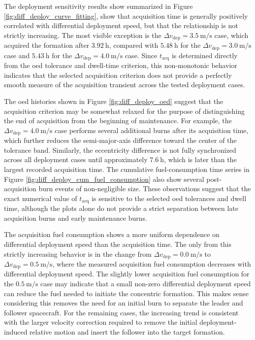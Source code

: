 The deployment sensitivity results show summarized in Figure \ref{fig:diff_deploy_curve_fitting}, show that acquisition time is generally positively correlated with differential deployment speed, but that the relationship is not strictly increasing. The most visible exception is the $\Delta v_{\mathrm{dep}}=3.5~\mathrm{m/s}$ case, which acquired the formation after $3.92~\mathrm{h}$, compared with $5.48~\mathrm{h}$ for the $\Delta v_{\mathrm{dep}}=3.0~\mathrm{m/s}$ case and $5.43~\mathrm{h}$ for the $\Delta v_{\mathrm{dep}}=4.0~\mathrm{m/s}$ case. Since $t_{\mathrm{acq}}$ is determined directly from the \gls{oed} tolerance and dwell-time criterion, this non-monotonic behavior indicates that the selected acquisition criterion does not provide a perfectly smooth measure of the acquisition transient across the tested deployment cases.

The \gls{oed} histories shown in Figure \ref{fig:diff_deploy_oed} suggest that the acquisition criterion may be somewhat relaxed for the purpose of distinguishing the end of acquisition from the beginning of maintenance. For example, the $\Delta v_{\mathrm{dep}}=4.0~\mathrm{m/s}$ case performs several additional burns after its acquisition time, which further reduces the semi-major-axis difference toward the center of the tolerance band. Similarly, the eccentricity difference is not fully synchronized across all deployment cases until approximately $7.6~\mathrm{h}$, which is later than the largest recorded acquisition time. The cumulative fuel-consumption time series in Figure \ref{fig:diff_deploy_cum_fuel_consumption} also show several post-acquisition burn events of non-negligible size. These observations suggest that the exact numerical value of $t_{\mathrm{acq}}$ is sensitive to the selected \gls{oed} tolerances and dwell time, although the plots alone do not provide a strict separation between late acquisition burns and early maintenance burns.

The acquisition fuel consumption shows a more uniform dependence on differential deployment speed than the acquisition time. The only from this strictly increasing behavior is in the change from $\Delta v_{\mathrm{dep}}=0.0~\mathrm{m/s}$ to $\Delta v_{\mathrm{dep}}=0.5~\mathrm{m/s}$, where the measured acquisition fuel consumption decreases with differential deployment speed. The slightly lower acquisition fuel consumption for the $0.5~\mathrm{m/s}$ case may indicate that a small non-zero differential deployment speed can reduce the fuel needed to initiate the concentric formation. This makes sense considering this removes the need for an initial burn to separate the leader and follower spacecraft. For the remaining cases, the increasing trend is consistent with the larger velocity correction required to remove the initial deployment-induced relative motion and insert the follower into the target formation.

